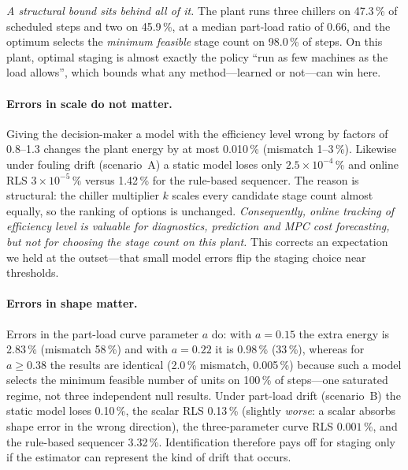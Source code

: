 \documentclass{svproc}
\begin{document}
\emph{A structural bound sits behind all of it.} The plant runs three chillers on 47.3\,\% of scheduled steps and two on 45.9\,\%, at a median part-load ratio of 0.66, and the optimum selects the \emph{minimum feasible} stage count on 98.0\,\% of steps. On this plant, optimal staging is almost exactly the policy ``run as few machines as the load allows'', which bounds what any method---learned or not---can win here.

\paragraph{Errors in scale do not matter.} Giving the decision-maker a model with the efficiency level wrong by factors of 0.8--1.3 changes the plant energy by at most 0.010\,\% (mismatch 1--3\,\%). Likewise under fouling drift (scenario~A) a static model loses only $2.5\times10^{-4}\,\%$ and online RLS $3\times10^{-5}\,\%$ versus 1.42\,\% for the rule-based sequencer. The reason is structural: the chiller multiplier $k$ scales every candidate stage count almost equally, so the ranking of options is unchanged. \emph{Consequently, online tracking of efficiency \emph{level} is valuable for diagnostics, prediction and MPC cost forecasting, but not for choosing the stage count on this plant.} This corrects an expectation we held at the outset---that small model errors flip the staging choice near thresholds.

\paragraph{Errors in shape matter.} Errors in the part-load curve parameter $a$ do: with $a=0.15$ the extra energy is 2.83\,\% (mismatch 58\,\%) and with $a=0.22$ it is 0.98\,\% (33\,\%), whereas for $a\ge0.38$ the results are identical (2.0\,\% mismatch, 0.005\,\%) because such a model selects the minimum feasible number of units on 100\,\% of steps---one saturated regime, not three independent null results. Under part-load drift (scenario~B) the static model loses 0.10\,\%, the scalar RLS 0.13\,\% (slightly \emph{worse}: a scalar absorbs shape error in the wrong direction), the three-parameter curve RLS $0.001\,\%$, and the rule-based sequencer 3.32\,\%. Identification therefore pays off for staging only if the estimator can represent the kind of drift that occurs.
\end{document}

